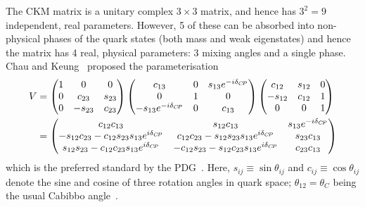 The CKM matrix is a unitary complex $3\times3$ matrix, and hence has $3^2=9$ independent, real parameters. However, 5 of these can be absorbed into non-physical phases of the quark states (both mass and weak eigenstates) and hence the matrix has 4 real, physical parameters: 3 mixing angles and a single phase. Chau and Keung~\cite{chauCommentsParametrizationKobayashiMaskawa1984} proposed the parameterisation
\begin{align}
\begin{split}\label{eq:CK_CKM_matrix}
        V &= 
        \begin{pmatrix}
            1 & 0 & 0 \\ 0 & c_{23} & s_{23} \\ 0 & -s_{23} & c_{23}
        \end{pmatrix}
        \begin{pmatrix}
            c_{13} & 0 & s_{13}e^{-i\delta_{{C\!P}}} \\ 0 & 1 & 0 \\ -s_{13}e^{-i\delta_{{C\!P}}} & 0 & c_{13}
        \end{pmatrix}
        \begin{pmatrix}
            c_{12} & s_{12}  & 0 \\ -s_{12} & c_{12} & 1 \\ 0 & 0 & 1
        \end{pmatrix}
        \\
        &=
        \begin{pmatrix}
            c_{12}c_{13} & s_{12}c_{13} & s_{13}e^{-i\delta_{{C\!P}}} \\
            -s_{12}c_{23}-c_{12}s_{23}s_{13}e^{i\delta_{{C\!P}}} &
            c_{12}c_{23}-s_{12}s_{23}s_{13}e^{i\delta_{{C\!P}}} &
            s_{23}c_{13} \\
            s_{12}s_{23}-c_{12}c_{23}s_{13}e^{i\delta_{{C\!P}}} &
            -c_{12}s_{23}-s_{12}c_{23}s_{13}e^{i\delta_{{C\!P}}} &
            c_{23}c_{13} \\
        \end{pmatrix}
\end{split}
\end{align}
which is the preferred standard by the PDG~\cite{PDG2019}. Here, $s_{ij}\equiv\sin \theta_{ij}$ and $c_{ij}\equiv\cos \theta_{ij}$ denote the sine and cosine of three rotation angles in quark space; $\theta_{12}=\theta_C$ being the usual Cabibbo angle~\cite{cabibboUnitarySymmetryLeptonic1963}.

